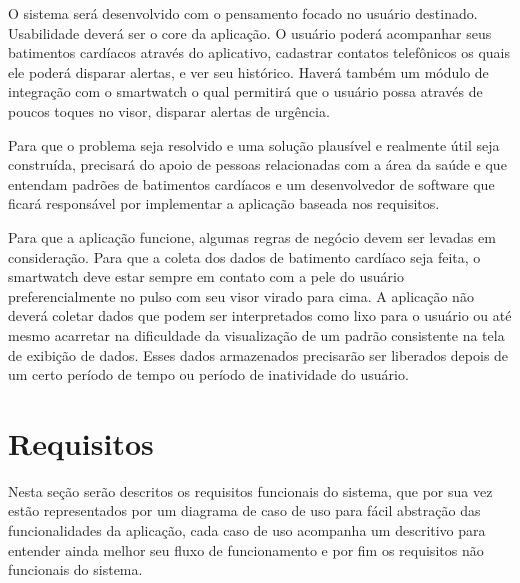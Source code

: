\documentclass[
	12pt,				%
	openright,			%
	twoside,			%
	a4paper,			%
	english,			%
	french,				%
	spanish,			%
	brazil				%
]{abntex2}
\begin{document}
O sistema será desenvolvido com o pensamento focado no usuário destinado. Usabilidade deverá ser o core da aplicação. O usuário poderá acompanhar seus batimentos cardíacos através do aplicativo, cadastrar contatos telefônicos os quais ele poderá disparar alertas, e ver seu histórico. Haverá também um módulo de integração com o smartwatch o qual permitirá que o usuário possa através de poucos toques no visor, disparar alertas de urgência.

Para que o problema seja resolvido e uma solução plausível e realmente útil seja construída, precisará do apoio de pessoas relacionadas com a área da saúde e que entendam padrões de batimentos cardíacos e um desenvolvedor de software que ficará responsável por implementar a aplicação baseada nos requisitos.

Para que a aplicação funcione, algumas regras de negócio devem ser levadas em consideração. Para que a coleta dos dados de batimento cardíaco seja feita, o smartwatch deve estar sempre em contato com a pele do usuário preferencialmente no pulso com seu visor virado para cima. A aplicação não deverá coletar dados que podem ser interpretados como lixo para o usuário ou até mesmo acarretar na dificuldade da visualização de um padrão consistente na tela de exibição de dados. Esses dados armazenados precisarão ser liberados depois de um certo período de tempo ou período de inatividade do usuário.




\chapter{Requisitos}
Nesta seção serão descritos os requisitos funcionais do sistema, que por sua vez estão representados por um diagrama de caso de uso para fácil abstração das funcionalidades da aplicação, cada caso de uso acompanha um descritivo para entender ainda melhor seu fluxo de funcionamento e por fim os requisitos não funcionais do sistema.
\end{document}
